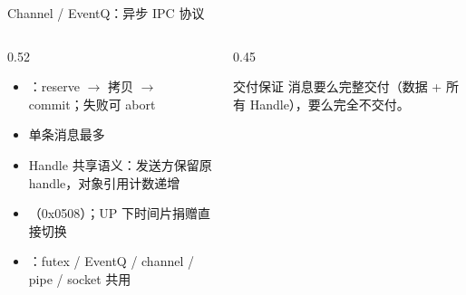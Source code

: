 \documentclass[aspectratio=1610]{beamer}
\begin{document}
\begin{frame}{Channel / EventQ：异步 IPC 协议}
    \begin{columns}[t]
        \begin{column}{0.52\textwidth}
            \footnotesize
            \begin{itemize}
                \item {}：reserve $\rightarrow$ 拷贝 $\rightarrow$ commit；失败可 abort
                \item 单条消息最多 
                \item Handle 共享语义：发送方保留原 handle，对象引用计数递增
                \item {}（0x0508）；UP 下时间片捐赠直接切换
                \item {}：futex / EventQ / channel / pipe / socket 共用 
            \end{itemize}
            \vspace{0.2em}
        \end{column}
        \begin{column}{0.45\textwidth}
            \vspace{0.2em}
            \begin{block}{交付保证}
                \footnotesize 消息要么完整交付（数据 + 所有 Handle），要么完全不交付。
            \end{block}
        \end{column}
    \end{columns}
\end{frame}
\end{document}
